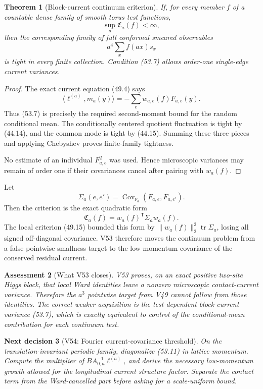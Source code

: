 \documentclass[11pt]{article}
\newtheorem{theorem}{Theorem}[section]
\newtheorem{decision}[theorem]{Next decision}
\newtheorem{assessment}[theorem]{Assessment}
\theoremstyle{remark}
\begin{document}
\begin{theorem}[Block-current continuum criterion]
\label{thm:v17v53-block}
If, for every member \(f\) of a countable dense family of smooth
torus test functions,
\[
\boxed{
 \sup_a\mathfrak C_a(f)<\infty,}                  \tag{53.7}
\]
then the corresponding family of full conformal smeared observables
\[
 a^4\sum_xf(ax)s_x                               \tag{53.8}
\]
is tight in every finite collection.  Condition (53.7) allows
order-one single-edge current variances.
\end{theorem}

\begin{proof}
The exact current equation (49.4) says
\[
 \langle\ell^{(a)},m_a(y)\rangle
 =
 -\sum_ew_{a,e}(f)F_{a,e}(y).                    \tag{53.9}
\]
Thus (53.7) is precisely the required second-moment bound for the
random conditional mean.  The conditionally centered quotient
fluctuation is tight by (44.14), and the common mode is tight by
(44.15).  Summing these three pieces and applying Chebyshev proves
finite-family tightness.

No estimate of an individual \(F_{a,e}^2\) was used.  Hence
microscopic variances may remain of order one if their covariances
cancel after pairing with \(w_a(f)\).
\end{proof}

Let
\[
 \Sigma_a(e,e')
 =
 \operatorname{Cov}_{\nu_a}(F_{a,e},F_{a,e'}).    \tag{53.10}
\]
Then the criterion is the exact quadratic form
\[
 \mathfrak C_a(f)
 =
 w_a(f)^{\mathsf T}\Sigma_aw_a(f).                \tag{53.11}
\]
The local criterion (49.15) bounded this form by
\(\|w_a(f)\|_2^2\operatorname{tr}\Sigma_a\), losing all signed
off-diagonal covariance.  V53 therefore moves the continuum problem
from a false pointwise smallness target to the low-momentum covariance
of the conserved residual current.

\begin{assessment}[What V53 closes]
\label{ass:v17v53-status}
V53 proves, on an exact positive two-site Higgs block, that local Ward
identities leave a nonzero microscopic contact-current variance.
Therefore the \(a^3\) pointwise target from V49 cannot follow from
those identities.  The correct weaker acquisition is the
test-dependent block-current variance (53.7), which is exactly
equivalent to control of the conditional-mean contribution for each
continuum test.
\end{assessment}

\begin{decision}[V54: Fourier current-covariance threshold]
\label{dec:v17v53-next}
On the translation-invariant periodic family, diagonalize (53.11) in
lattice momentum.  Compute the multiplier of
\(BA_{0,a}^{-1}\ell^{(a)}\), and derive the necessary low-momentum
growth allowed for the longitudinal current structure factor.
Separate the contact term from the Ward-cancelled part before asking
for a scale-uniform bound.
\end{decision}
\end{document}
